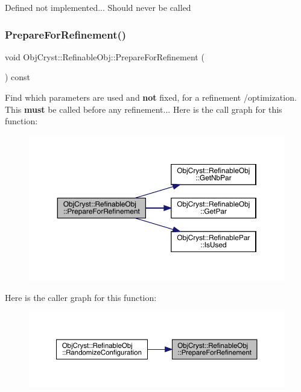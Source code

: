Defined not implemented... Should never be called \mbox{\label{class_obj_cryst_1_1_refinable_obj_a6710a75c0477b6ad7e42400cdc6f1c32}} 
\subsubsection{\texorpdfstring{PrepareForRefinement()}{PrepareForRefinement()}}
{\footnotesize\ttfamily void Obj\+Cryst\+::\+Refinable\+Obj\+::\+Prepare\+For\+Refinement (\begin{DoxyParamCaption}{ }\end{DoxyParamCaption}) const}

Find which parameters are used and {\bfseries{not}} fixed, for a refinement /optimization. This {\bfseries{must}} be called before any refinement... Here is the call graph for this function\+:
\nopagebreak
\begin{figure}[H]
\begin{center}
\leavevmode
\includegraphics[width=350pt]{class_obj_cryst_1_1_refinable_obj_a6710a75c0477b6ad7e42400cdc6f1c32_cgraph}
\end{center}
\end{figure}
Here is the caller graph for this function\+:
\nopagebreak
\begin{figure}[H]
\begin{center}
\leavevmode
\includegraphics[width=350pt]{class_obj_cryst_1_1_refinable_obj_a6710a75c0477b6ad7e42400cdc6f1c32_icgraph}
\end{center}
\end{figure}
\mbox{\label{class_obj_cryst_1_1_refinable_obj_ae0d568b66a8bfe39ebbb648d68a57239}} 
